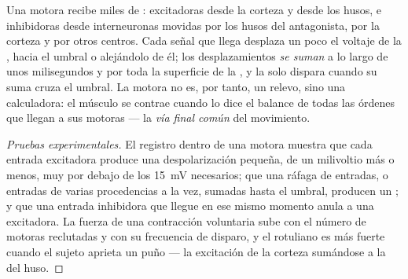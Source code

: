 \begin{proposition}\label{prop:g12:brain-and-movement:integration}
Una  motora recibe miles de : excitadoras desde la
corteza y desde los husos, e inhibidoras desde interneuronas movidas
por los husos del antagonista, por la corteza y por otros centros. Cada
señal que llega desplaza un poco el voltaje de la , hacia el
umbral o alejándolo de él; los desplazamientos \emph{se suman} a lo
largo de unos milisegundos y por toda la superficie de la , y la
 solo dispara cuando su suma cruza el umbral. La  motora
no es, por tanto, un relevo, sino una calculadora: el músculo se
contrae cuando lo dice el balance de todas las órdenes que llegan a sus
 motoras --- la \emph{vía final común}
del movimiento.
\end{proposition}
\begin{proof}[Pruebas experimentales]
El registro dentro de una  motora muestra que cada entrada
excitadora produce una despolarización pequeña, de un milivoltio más o
menos, muy por debajo de los \qty{15}{mV} necesarios; que una ráfaga de
entradas, o entradas de varias procedencias a la vez, sumadas hasta el
umbral, producen un ; y que una entrada inhibidora
que llegue en ese mismo momento anula a una excitadora. La fuerza de
una contracción voluntaria sube con el número de  motoras
reclutadas y con su frecuencia de disparo, y el  rotuliano es
más fuerte cuando el sujeto aprieta un puño --- la excitación de la
corteza sumándose a la del huso.
\end{proof}

